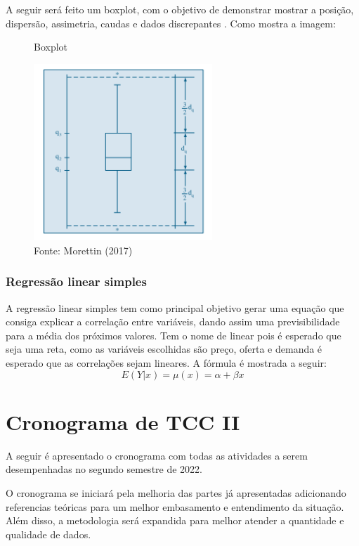 \documentclass[12pt]{article}
\begin{document}
A seguir será feito um boxplot, com o objetivo de demonstrar mostrar a posição, dispersão, assimetria, caudas e dados discrepantes \cite{morettin2017estatistica}. Como mostra a imagem:

\begin{figure}[H]
    \begin{center}
        \caption{Boxplot}
        \includegraphics[width=0.6\textwidth]{boxplot.png}
        \caption*{Fonte: Morettin (2017)}
        \label{blxplot}
    \end{center}
\end{figure}

\subsubsection{Regressão linear simples}

A regressão linear simples tem como principal objetivo gerar uma equação que consiga explicar a correlação entre variáveis, dando assim uma previsibilidade para a média dos próximos valores. Tem o nome de linear pois é esperado que seja uma reta, como as variáveis escolhidas são preço, oferta e demanda é esperado que as correlações sejam lineares. A fórmula é mostrada a seguir:
\[E(Y|x) = \mu (x) = \alpha + \beta x\]

\pagebreak

\section{Cronograma de TCC II}

A seguir é apresentado o cronograma com todas as atividades a serem desempenhadas no segundo semestre de 2022. 

O cronograma se iniciará pela melhoria das partes já apresentadas adicionando referencias teóricas para um melhor embasamento e entendimento da situação. Além disso, a metodologia será expandida para melhor atender a quantidade e qualidade de dados.
\end{document}
